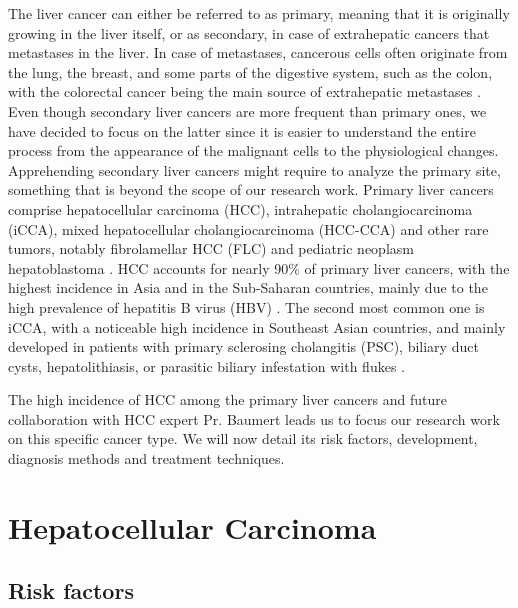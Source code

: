 The liver cancer can either be referred to as primary, meaning that it
is originally growing in the liver itself, or as secondary, in case of
extrahepatic cancers that metastases in the liver.
In case of metastases, cancerous cells often originate from the lung,
the breast, and some parts of the digestive system, such as the colon,
with the colorectal cancer being the main source of extrahepatic
metastases \cite{Hoyer2012a, Sahani2014}.
Even though secondary liver cancers are more frequent than primary ones,
we have decided to focus on the latter since it is easier to understand the entire process
from the appearance of the malignant cells to the physiological changes. Apprehending secondary liver cancers might require to analyze the primary site, something that is beyond the scope of our research work.
Primary liver cancers comprise hepatocellular carcinoma (HCC),
intrahepatic cholangiocarcinoma (iCCA), mixed hepatocellular
cholangiocarcinoma (HCC-CCA) and other rare tumors, notably
fibrolamellar HCC (FLC) and pediatric neoplasm hepatoblastoma
\cite{Sia2017, Lozano2012,20113051318}.
HCC accounts for nearly 90\% of primary liver cancers, with the highest
incidence in Asia and in the Sub-Saharan countries, mainly due to the
high prevalence of hepatitis B virus (HBV) \cite{Sia2017, Torre2015}. The second most common one is iCCA, with a
noticeable high incidence in Southeast Asian countries, and mainly
developed in patients with primary sclerosing cholangitis (PSC),
biliary duct cysts, hepatolithiasis, or parasitic biliary infestation
with flukes \cite{Sia2017, Bridgewater2014}.

The high incidence of HCC among the primary liver cancers and future collaboration with HCC expert Pr. Baumert leads us to focus our research work on
this specific cancer type. We will now detail its risk factors,
development, diagnosis methods and treatment techniques.

\section{Hepatocellular Carcinoma}\label{hepatocellular-carcinoma}

\subsection{Risk factors}\label{risk-factors}

